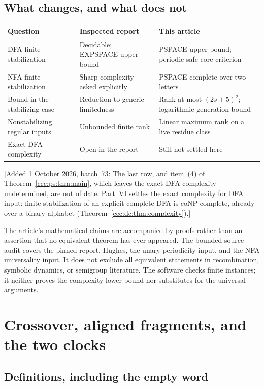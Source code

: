 \documentclass[11pt,letterpaper]{article}
\theoremstyle{definition}
\theoremstyle{remark}
\newcommand{\waddsevthree}[1]{\textup{[}Added 1 October 2026, batch~73: #1\textup{]}}
\begin{document}
\subsection{What changes, and what does not}

\begin{center}\small
\begin{tabular}{@{}L{.27\textwidth}L{.30\textwidth}L{.36\textwidth}@{}}
\toprule
Question & Inspected report & This article\\
\midrule
DFA finite stabilization & Decidable; EXPSPACE upper bound & PSPACE upper bound; periodic safe-core criterion\\[4pt]
NFA finite stabilization & Sharp complexity asked explicitly & PSPACE-complete over two letters\\[4pt]
Bound in the stabilizing case & Reduction to generic limitedness & Rank at most $(2s+5)^2$; logarithmic generation bound\\[4pt]
Nonstabilizing regular inputs & Unbounded finite rank & Linear maximum rank on a live residue class\\[4pt]
Exact DFA complexity & Open in the report & Still not settled here\\
\bottomrule
\end{tabular}
\end{center}
\waddsevthree{The last row, and item~(4) of Theorem~\ref{ccc:ps:thm:main},
which leaves the exact DFA complexity undetermined, are out of date. Part~VI settles the exact complexity for DFA input: finite stabilization of an explicit complete DFA is coNP-complete, already over a binary alphabet (Theorem~\ref{ccc:dc:thm:complexity}).}

The article's mathematical claims are accompanied by proofs rather than an
assertion that no equivalent theorem has ever appeared. The bounded source
audit covers the pinned report, Hughes, the unary-periodicity input, and
the NFA universality input. It does not exclude all equivalent statements
in recombination, symbolic dynamics, or semigroup literature. The software
checks finite instances; it neither proves the complexity lower bound nor
substitutes for the universal arguments.

\section{Crossover, aligned fragments, and the two clocks}\label{ccc:ps:sec:rank}

\subsection{Definitions, including the empty word}
\end{document}
